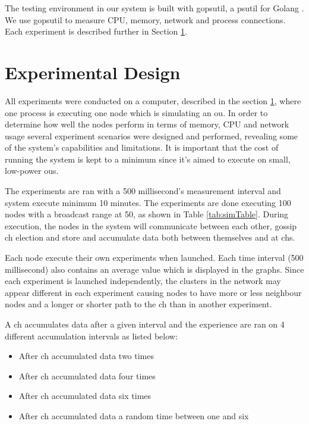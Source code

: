 \documentclass[USenglish]{uit-thesis}
\begin{document}
The testing environment in our system is built with gopsutil, a psutil for Golang \cite{golangPsutil}. We use gopsutil to measure CPU, memory, network and process connections. Each experiment is described further in Section \ref{eva:exp_des}.

\section{Experimental Design} \label{eva:exp_des}

All experiments were conducted on a computer, described in the section \ref{eva:exp_des}, where one process is executing one node which is simulating an \gls{ou}. In order to determine how well the nodes perform in terms of memory, CPU and network usage several experiment scenarios were designed and performed, revealing some of the system's capabilities and limitations. It is important that the cost of running the system is kept to a minimum since it's aimed to execute on small, low-power \gls{ou}s.

The experiments are ran with a 500 millisecond's measurement interval and system execute minimum 10 minutes. The experiments are done executing 100 nodes with a broadcast range at 50, as shown in Table \ref{tab:simTable}. During execution, the nodes in the system will communicate between each other, gossip \gls{ch} election and store and accumulate data both between themselves and at \gls{ch}s.

Each node execute their own experiments when launched. Each time interval (500 millisecond) also contains an average value which is displayed in the graphs. Since each experiment is launched  independently, the clusters in the network may appear different in each experiment causing nodes to have more or less neighbour nodes and a longer or shorter path to the \gls{ch} than in another experiment.

A \gls{ch} accumulates data after a given interval and the experience are ran on 4 different accumulation intervals as listed below:

\begin{itemize}
\item After \gls{ch} accumulated data two times
\item After \gls{ch} accumulated data four times
\item After \gls{ch} accumulated data six times
\item After \gls{ch} accumulated data a random time between one and six
\end{itemize}
\end{document}
